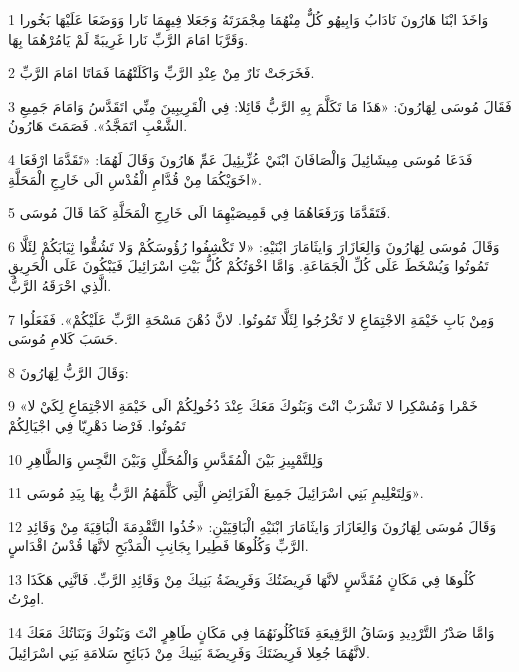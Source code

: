 \par 1 وَاخَذَ ابْنَا هَارُونَ نَادَابُ وَابِيهُو كُلٌّ مِنْهُمَا مِجْمَرَتَهُ وَجَعَلا فِيهِمَا نَارا وَوَضَعَا عَلَيْهَا بَخُورا وَقَرَّبَا امَامَ الرَّبِّ نَارا غَرِيبَةً لَمْ يَامُرْهُمَا بِهَا.
\par 2 فَخَرَجَتْ نَارٌ مِنْ عِنْدِ الرَّبِّ وَاكَلَتْهُمَا فَمَاتَا امَامَ الرَّبِّ.
\par 3 فَقَالَ مُوسَى لِهَارُونَ: «هَذَا مَا تَكَلَّمَ بِهِ الرَّبُّ قَائِلا: فِي الْقَرِيبِينَ مِنِّي اتَقَدَّسُ وَامَامَ جَمِيعِ الشَّعْبِ اتَمَجَّدُ». فَصَمَتَ هَارُونُ.
\par 4 فَدَعَا مُوسَى مِيشَائِيلَ وَالْصَافَانَ ابْنَيْ عُزِّيئِيلَ عَمِّ هَارُونَ وَقَالَ لَهُمَا: «تَقَدَّمَا ارْفَعَا اخَوَيْكُمَا مِنْ قُدَّامِ الْقُدْسِ الَى خَارِجِ الْمَحَلَّةِ».
\par 5 فَتَقَدَّمَا وَرَفَعَاهُمَا فِي قَمِيصَيْهِمَا الَى خَارِجِ الْمَحَلَّةِ كَمَا قَالَ مُوسَى.
\par 6 وَقَالَ مُوسَى لِهَارُونَ وَالِعَازَارَ وَايثَامَارَ ابْنَيْهِ: «لا تَكْشِفُوا رُؤُوسَكُمْ وَلا تَشُقُّوا ثِيَابَكُمْ لِئَلَّا تَمُوتُوا وَيُسْخَطَ عَلَى كُلِّ الْجَمَاعَةِ. وَامَّا اخْوَتُكُمْ كُلُّ بَيْتِ اسْرَائِيلَ فَيَبْكُونَ عَلَى الْحَرِيقِ الَّذِي احْرَقَهُ الرَّبُّ.
\par 7 وَمِنْ بَابِ خَيْمَةِ الاجْتِمَاعِ لا تَخْرُجُوا لِئَلَّا تَمُوتُوا. لانَّ دُهْنَ مَسْحَةِ الرَّبِّ عَلَيْكُمْ». فَفَعَلُوا حَسَبَ كَلامِ مُوسَى.
\par 8 وَقَالَ الرَّبُّ لِهَارُونَ:
\par 9 «خَمْرا وَمُسْكِرا لا تَشْرَبْ انْتَ وَبَنُوكَ مَعَكَ عِنْدَ دُخُولِكُمْ الَى خَيْمَةِ الاجْتِمَاعِ لِكَيْ لا تَمُوتُوا. فَرْضا دَهْرِيّا فِي اجْيَالِكُمْ
\par 10 وَلِلتَّمْيِيزِ بَيْنَ الْمُقَدَّسِ وَالْمُحَلَّلِ وَبَيْنَ النَّجِسِ وَالطَّاهِرِ
\par 11 وَلِتَعْلِيمِ بَنِي اسْرَائِيلَ جَمِيعَ الْفَرَائِضِ الَّتِي كَلَّمَهُمُ الرَّبُّ بِهَا بِيَدِ مُوسَى».
\par 12 وَقَالَ مُوسَى لِهَارُونَ وَالِعَازَارَ وَايثَامَارَ ابْنَيْهِ الْبَاقِيَيْنِ: «خُذُوا التَّقْدِمَةَ الْبَاقِيَةَ مِنْ وَقَائِدِ الرَّبِّ وَكُلُوهَا فَطِيرا بِجَانِبِ الْمَذْبَحِ لانَّهَا قُدْسُ اقْدَاسٍ.
\par 13 كُلُوهَا فِي مَكَانٍ مُقَدَّسٍ لانَّهَا فَرِيضَتُكَ وَفَرِيضَةُ بَنِيكَ مِنْ وَقَائِدِ الرَّبِّ. فَانَّنِي هَكَذَا امِرْتُ.
\par 14 وَامَّا صَدْرُ التَّرْدِيدِ وَسَاقُ الرَّفِيعَةِ فَتَاكُلُونَهُمَا فِي مَكَانٍ طَاهِرٍ انْتَ وَبَنُوكَ وَبَنَاتُكَ مَعَكَ لانَّهُمَا جُعِلا فَرِيضَتَكَ وَفَرِيضَةَ بَنِيكَ مِنْ ذَبَائِحِ سَلامَةِ بَنِي اسْرَائِيلَ.
